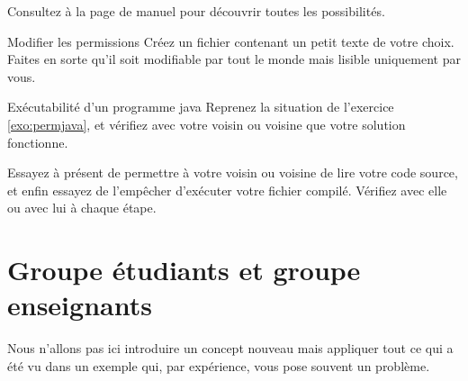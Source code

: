 \documentclass[a4paper,11pt]{style-esi/td}
\begin{document}
			Consultez à la page de manuel pour découvrir toutes les possibilités.

			\begin{Exercice}{Modifier les permissions}
				Créez un fichier  
				contenant un petit texte de votre choix.
				Faites en sorte qu'il soit modifiable par tout le monde
				mais lisible uniquement par vous.
                              \end{Exercice}

                        \begin{Exercice}{Exécutabilité d'un programme java}
                          Reprenez la situation de l'exercice \ref{exo:permjava}, et vérifiez avec votre voisin ou voisine que votre solution fonctionne.

                          Essayez à présent de permettre à votre voisin ou voisine de lire votre code source, et enfin essayez de l'empêcher d'exécuter votre fichier compilé. Vérifiez avec elle ou avec lui à chaque étape.
                        \end{Exercice}

	\section{Groupe étudiants et groupe enseignants}

		\begin{alertbox}
			Nous n'allons pas ici introduire un concept nouveau
			mais appliquer tout ce qui a été vu dans un exemple
			qui, par expérience, vous pose souvent un problème. 
		\end{alertbox}
\end{document}
